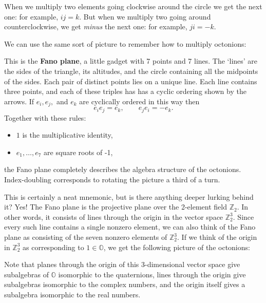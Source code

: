 \documentclass[12pt]{article}
\newcommand\Z{{\mathbb Z}}
\renewcommand\O{{\mathbb O}}
\begin{document}
\noindent   
When we multiply two elements going clockwise around the circle we get   
the next one: for example, $ij = k$.  But when we multiply two   
going around counterclockwise, we get {\it minus} the next one:    
for example, $ji = -k$.     
   
We can use the same sort of picture to remember how to multiply   
octonions:   
\medskip

\centerline{\epsfysize=1.5in}   
\label{Fano}   
\medskip

\noindent   
This is the {\bf Fano plane}, a little gadget    
with 7 points and 7 lines.  The `lines' are the sides of the triangle,    
its altitudes, and the circle containing all the midpoints of the sides.   
Each pair of distinct points lies on a unique line.  Each line contains    
three points, and each of these triples has has a cyclic ordering    
shown by the arrows.  If $e_i, e_j,$ and $e_k$ are cyclically ordered    
in this way then    
\[            e_i e_j = e_k,  \qquad e_j e_i = -e_k  . \]   
Together with these rules:   
\begin{itemize}   
\item $1$ is the multiplicative identity,   
\item $e_1, \dots, e_7$ are square roots of -1,   
\end{itemize}   
the Fano plane completely describes the algebra structure of the
octonions.   Index-doubling corresponds to rotating the picture
a third of a turn.
   
This is certainly a neat mnemonic, but is there anything deeper lurking   
behind it?  Yes!  The Fano plane is the projective plane over the 2-element
field $\Z_2$.  In other words, it consists of lines through the origin 
in the vector space $\Z_2^3$.  Since every such line contains a single 
nonzero element, we can also think of the Fano plane as consisting of the 
seven nonzero elements of $\Z_2^3$.  If we think of the origin in $\Z_2^3$
as corresponding to $1 \in \O$, we get the following picture of the 
octonions:   

\medskip
\centerline{\epsfysize=1.5in}   
\label{cube}   
\medskip

\noindent    
Note that planes through the origin of this 3-dimensional vector space    
give subalgebras of $\O$ isomorphic to the quaternions, lines through   
the origin give subalgebras isomorphic to the complex numbers, and   
the origin itself gives a subalgebra isomorphic to the real numbers.      
   
\end{document}
